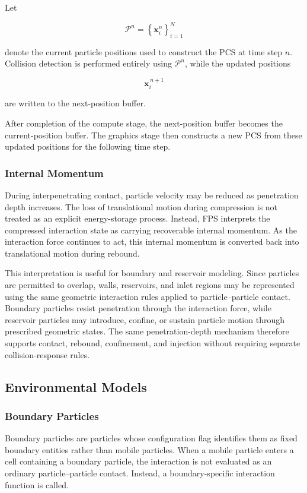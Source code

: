 Let

\[
\mathcal{P}^n=
\left\{\mathbf{x}_i^n\right\}_{i=1}^{N}
\]

denote the current particle positions used to construct
the PCS at time step \(n\). Collision detection is
performed entirely using \(\mathcal{P}^n\), while the
updated positions

\[
\mathbf{x}_i^{\,n+1}
\]

are written to the next-position buffer.

After completion of the compute stage, the
next-position buffer becomes the current-position buffer.
The graphics stage then constructs a new PCS from these
updated positions for the following time step.


\subsubsection{Internal Momentum}

During interpenetrating contact, particle velocity may
be reduced as penetration depth increases. The loss of
translational motion during compression is not treated
as an explicit energy-storage process. Instead, FPS
interprets the compressed interaction state as carrying
recoverable internal momentum. As the interaction force
continues to act, this internal momentum is converted
back into translational motion during rebound.

This interpretation is useful for boundary and reservoir
modeling. Since particles are permitted to overlap,
walls, reservoirs, and inlet regions may be represented
using the same geometric interaction rules applied to
particle--particle contact. Boundary particles resist
penetration through the interaction force, while
reservoir particles may introduce, confine, or sustain
particle motion through prescribed geometric states.
The same penetration-depth mechanism therefore supports
contact, rebound, confinement, and injection without
requiring separate collision-response rules.

\subsection{Environmental Models}

\subsubsection{Boundary Particles}


Boundary particles are particles whose configuration
flag identifies them as fixed boundary entities rather
than mobile particles. When a mobile particle enters a
cell containing a boundary particle, the interaction is
not evaluated as an ordinary particle--particle contact.
Instead, a boundary-specific interaction function is
called.

